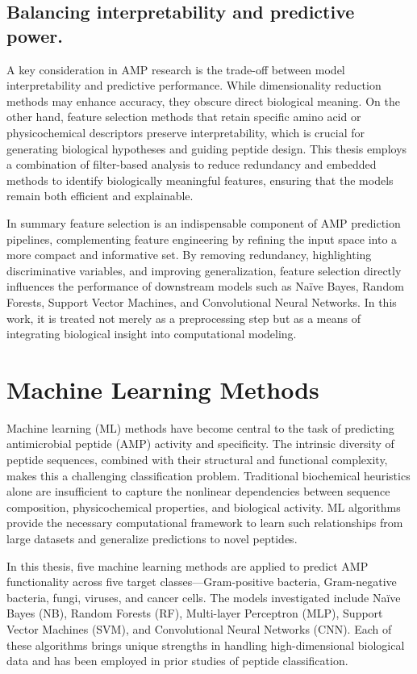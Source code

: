\documentclass[a4paper,twoside,12pt]{book}
\begin{document}
\subsection{Balancing interpretability and predictive power.}
A key consideration in AMP research is the trade-off between model interpretability and predictive performance. While dimensionality reduction methods may enhance accuracy, they obscure direct biological meaning. On the other hand, feature selection methods that retain specific amino acid or physicochemical descriptors preserve interpretability, which is crucial for generating biological hypotheses and guiding peptide design. This thesis employs a combination of filter-based analysis to reduce redundancy and embedded methods to identify biologically meaningful features, ensuring that the models remain both efficient and explainable.

In summary feature selection is an indispensable component of AMP prediction pipelines, complementing feature engineering by refining the input space into a more compact and informative set. By removing redundancy, highlighting discriminative variables, and improving generalization, feature selection directly influences the performance of downstream models such as Naïve Bayes, Random Forests, Support Vector Machines, and Convolutional Neural Networks. In this work, it is treated not merely as a preprocessing step but as a means of integrating biological insight into computational modeling.

\section{Machine Learning Methods}

Machine learning (ML) methods have become central to the task of predicting antimicrobial peptide (AMP) activity and specificity. The intrinsic diversity of peptide sequences, combined with their structural and functional complexity, makes this a challenging classification problem. Traditional biochemical heuristics alone are insufficient to capture the nonlinear dependencies between sequence composition, physicochemical properties, and biological activity. ML algorithms provide the necessary computational framework to learn such relationships from large datasets and generalize predictions to novel peptides.

In this thesis, five machine learning methods are applied to predict AMP functionality across five target classes—Gram-positive bacteria, Gram-negative bacteria, fungi, viruses, and cancer cells. The models investigated include Naïve Bayes (NB), Random Forests (RF), Multi-layer Perceptron (MLP), Support Vector Machines (SVM), and Convolutional Neural Networks (CNN). Each of these algorithms brings unique strengths in handling high-dimensional biological data and has been employed in prior studies of peptide classification.
\end{document}
